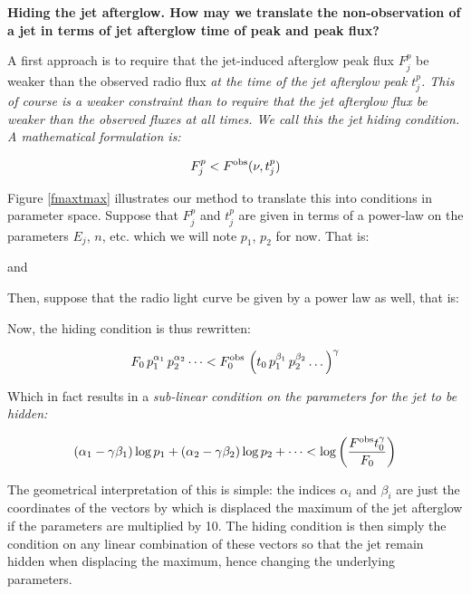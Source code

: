\bf{Hiding the jet afterglow.} How may we translate the non-observation of a jet in terms of jet afterglow time of peak and peak flux?

A first approach is to require that the jet-induced afterglow peak flux $F_j^p$ be weaker than the observed radio flux \it{at the time of the jet afterglow peak} $t_j^p$. This of course is a weaker constraint than to require that the jet afterglow flux be \it{weaker than the observed fluxes at all times}. We call this the \it{jet hiding} condition. A mathematical formulation is:

\begin{equation}F_j^p < F^{\rm{obs}}(\nu, t_j^p) \end{equation}

Figure \ref{fmaxtmax} illustrates our method to translate this into conditions in parameter space. Suppose that $F_j^p$ and $t_j^p$ are given in terms of a power-law on the parameters $E_j$, $n$, etc. which we will note $p_1$, $p_2$ for now. That is:


and


Then, suppose that the radio light curve be given by a power law as well, that is:

\cen{\Fobs(\nu, \tobs) = \Fobs_0 \tobs^{\gamma}}

Now, the hiding condition is thus rewritten:

\begin{equation}F_0 \,p_1^{\alpha_1} \,p_2^{\alpha_2} \dots < \Fobs_0 \,\left( t_0 \,p_1^{\beta_1} \,p_2^{\beta_2} \dots \right)^{\gamma} \end{equation}

Which in fact results in a \it{sub-linear condition} on the parameters for the jet to be hidden:

\begin{equation}(\alpha_1 - \gamma \beta_1) \log p_1 + (\alpha_2 - \gamma \beta_2) \log p_2 + \dots < \log \left( \frac{\Fobs t_0 ^\gamma}{F_0} \right) \end{equation}

The geometrical interpretation of this is simple: the indices $\alpha_i$ and $\beta_i$ are just the coordinates of the vectors by which is displaced the maximum of the jet afterglow if the parameters are multiplied by 10. The hiding condition is then simply the condition on any linear combination of these vectors so that the jet remain hidden when displacing the maximum, hence changing the underlying parameters.


